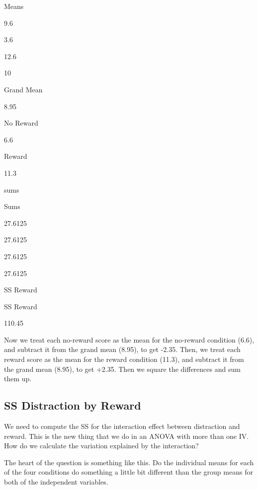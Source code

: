 \documentclass[
]{book}
\begin{document}
Means

9.6

3.6

12.6

10

Grand Mean

8.95

No Reward

6.6

Reward

11.3

sums

Sums

27.6125

27.6125

27.6125

27.6125

SS Reward

SS Reward

110.45

Now we treat each no-reward score as the mean for the no-reward condition (6.6), and subtract it from the grand mean (8.95), to get -2.35. Then, we treat each reward score as the mean for the reward condition (11.3), and subtract it from the grand mean (8.95), to get +2.35. Then we square the differences and sum them up.

\hypertarget{ss-distraction-by-reward}{%
\subsection{SS Distraction by Reward}\label{ss-distraction-by-reward}}

We need to compute the SS for the interaction effect between distraction and reward. This is the new thing that we do in an ANOVA with more than one IV. How do we calculate the variation explained by the interaction?

The heart of the question is something like this. Do the individual means for each of the four conditions do something a little bit different than the group means for both of the independent variables.
\end{document}
